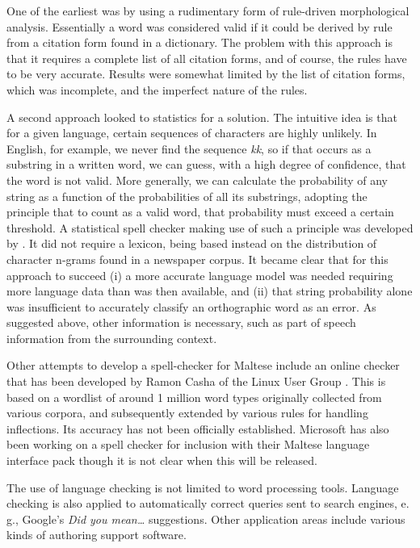\documentclass[]{../../metanetpaper}
\begin{document}
\begin{multicols}{2}
One of the earliest was by \cite{Mangion:1999} using a rudimentary form of rule-driven morphological analysis. Essentially a word was considered valid if it could be derived by rule from a citation form found in a dictionary. The problem with this approach is that it requires a complete list of all citation forms, and of course, the rules have to be very accurate. Results were somewhat limited by the list of citation forms, which was incomplete, and the imperfect nature of the rules.

A second approach looked to statistics for a solution. The intuitive idea is that for a given language, certain sequences of characters are highly unlikely. In English, for example, we never find the sequence \emph{kk}, so if that occurs as a substring in a written word, we can guess, with a high degree of confidence, that the word is not valid. More generally, we can calculate the probability of any string as a function of the probabilities of all its substrings, adopting the principle that to count as a valid word, that probability must exceed a certain threshold. A statistical spell checker making use of such a principle was developed by \cite{Mizzi:2000}. It did not require a lexicon, being based instead on the distribution of character n-grams found in a newspaper corpus. It became clear that for this approach to succeed (i) a more accurate language model was needed requiring more language data than was then available, and (ii) that string probability alone was insufficient to accurately classify an orthographic word as an error. As suggested above, other information is necessary, such as part of speech information from the surrounding context.

Other attempts to develop a spell-checker for Maltese include an online checker that has been developed by Ramon Casha of the Linux User Group \cite{Linux-spellcheck1}.  This is based on a wordlist of around 1 million word types originally collected from various corpora, and subsequently extended by various rules for handling inflections. Its accuracy has not been officially established. Microsoft has also been working on a spell checker for inclusion with their Maltese language interface pack though it is not clear when this will be released.

The use of language checking is not limited to word processing tools. Language checking is also applied to automatically correct queries sent to search engines, e.\,g., Google’s \emph{Did you mean…} suggestions. Other application areas include various kinds of authoring support software. 


\end{multicols}
\end{document}
